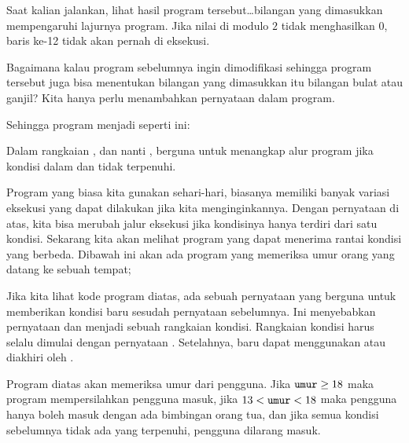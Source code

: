 \documentclass[../main.tex]{subfiles}
\begin{document}

Saat kalian jalankan, lihat hasil program tersebut\ldots{}bilangan yang
dimasukkan mempengaruhi lajurnya program. Jika nilai  di modulo \(2\)
tidak menghasilkan \(0\), baris ke-12 tidak akan pernah di eksekusi.

Bagaimana kalau program sebelumnya ingin dimodifikasi sehingga program tersebut
juga bisa menentukan bilangan yang dimasukkan itu bilangan bulat atau ganjil?
Kita hanya perlu menambahkan pernyataan  dalam program.

Sehingga program menjadi seperti ini:


Dalam rangkaian , dan nanti ,  berguna
untuk menangkap alur program jika kondisi dalam  dan 
tidak terpenuhi.

Program yang biasa kita gunakan sehari-hari, biasanya memiliki banyak variasi
eksekusi yang dapat dilakukan jika kita menginginkannya. Dengan pernyataan
 di atas, kita bisa merubah jalur eksekusi jika kondisinya hanya
terdiri dari satu kondisi. Sekarang kita akan melihat program yang dapat
menerima rantai kondisi yang berbeda. Dibawah ini akan ada program yang memeriksa
umur orang yang datang ke sebuah tempat;


Jika kita lihat kode program diatas, ada sebuah pernyataan  yang
berguna untuk memberikan kondisi baru sesudah pernyataan  sebelumnya.
Ini menyebabkan pernyataan  dan  menjadi sebuah
rangkaian kondisi. Rangkaian kondisi harus selalu dimulai dengan pernyataan
. Setelahnya, baru dapat menggunakan  atau diakhiri
oleh .

Program diatas akan memeriksa umur dari pengguna. Jika \(\mbox{\texttt{umur}} \geq 18\)
maka program mempersilahkan pengguna masuk, jika \(13 < \mbox{\texttt{umur}} < 18\)
maka pengguna hanya boleh masuk dengan ada bimbingan orang tua, dan jika semua
kondisi sebelumnya tidak ada yang terpenuhi, pengguna dilarang masuk.
\end{document}
